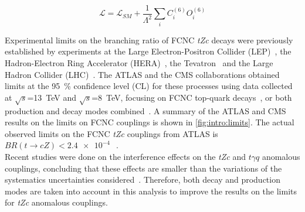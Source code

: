 \begin{equation}
\mathcal{L} = \mathcal{L}_{SM} + \frac{1}{\Lambda^2}\sum_{i} C_{i}^{(6)} O_{i}^{(6)}  
\label{eq:lagrangian}
\end{equation}

\noindent Experimental limits on the branching ratio of FCNC \textit{tZc} decays were previously established by experiments at the Large Electron-Positron Collider (LEP)~\cite{ALEPH,DELPHI,OPAL,L3}, the Hadron-Electron Ring Accelerator (HERA)~\cite{ZEUS}, the Tevatron\ \cite{CDF,DZero} and the Large Hadron Collider (LHC)~\cite{TOPQ-2017-06,Chatrchyan:2013nwa,CMS-TOP-12-039}. The ATLAS and the CMS collaborations obtained limits at the \SI{95}{\percent} confidence level (CL) for these processes using data collected at $\sqrt{s}$=\SI{13}{\TeV} and $\sqrt{s}$=\SI{8}{\TeV}, focusing on FCNC top-quark decays~\cite{TOPQ-2017-06,Chatrchyan:2013nwa}, or both production and decay modes combined~\cite{CMS-TOP-12-039}. 
A summary of the ATLAS and CMS results on the limits on FCNC couplings is shown in \cref{fig:intro:limits}. The actual observed limits on the FCNC \textit{tZc} couplings from ATLAS is $BR(t\to cZ) < \SI{2.4e-4}{}$~\cite{TOPQ-2017-06}.\\
Recent studies were done on the interference effects on the \textit{tZc} and $t\gamma q$ anomalous couplings, concluding that these effects are smaller than the variations of the systematics uncertainties considered~\cite{Interference}. Therefore, both decay and production modes are taken into account in this analysis to improve the results on the limits for \textit{tZc} anomalous couplings.

